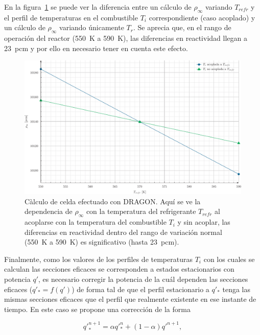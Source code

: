 \documentclass[11pt]{article}
\begin{document}
En la figura~\ref{fig:xs-vs-trefr-simple} se puede ver la diferencia entre un cálculo de $\rho_{\infty}$ variando $T_{refr}$ y el perfil de temperaturas en el combustible $T_i$ correspondiente (caso acoplado) y un cálculo de $\rho_{\infty}$ variando únicamente $T_r$. Se aprecia que, en el rango de operación del reactor (\num{550}~\si{\kelvin} a \num{590}~\si{\kelvin}), las diferencias en reactividad llegan a \num{23}~\si{pcm} y por ello en necesario tener en cuenta este efecto.

\begin{figure}[!h]
 \begin{center}
  \includegraphics[width=0.78\linewidth]{graficos/rho-vs-tref-simple/xs-vs-trefr-simple.pdf}
 \end{center}
\caption{\label{fig:xs-vs-trefr-simple} Càlculo de celda efectuado con DRAGON. Aquí se ve la dependencia de $\rho_{\infty}$ con la temperatura del refrigerante $T_{refr}$ al acoplarse con la temperatura del combustible $T_i$ y sin acoplar, las diferencias en reactividad dentro del rango de variación normal (\num{550}~\si{\kelvin} a \num{590}~\si{\kelvin}) es significativo (hasta \num{23}~\si{pcm}).}
\end{figure}

Finalmente, como los valores de los perfiles de temperaturas $T_i$ con los cuales se calculan las secciones eficaces se corresponden a estados estacionarios con potencia $q\prime$, es necesario corregir la potencia de la cuál dependen las secciones eficaces ($q\prime_{*} = f (q\prime)$) de forma tal de que el perfil estacionario a $q\prime_{*}$ tenga las mismas secciones eficaces que el perfil que realmente existente en ese instante de tiempo. En este caso se propone una corrección de la forma

\begin{equation}
q\prime^{n+1}_{*} = \alpha q\prime^{n}_{*}+ (1-\alpha) q\prime^{n+1},
\end{equation}
\end{document}
